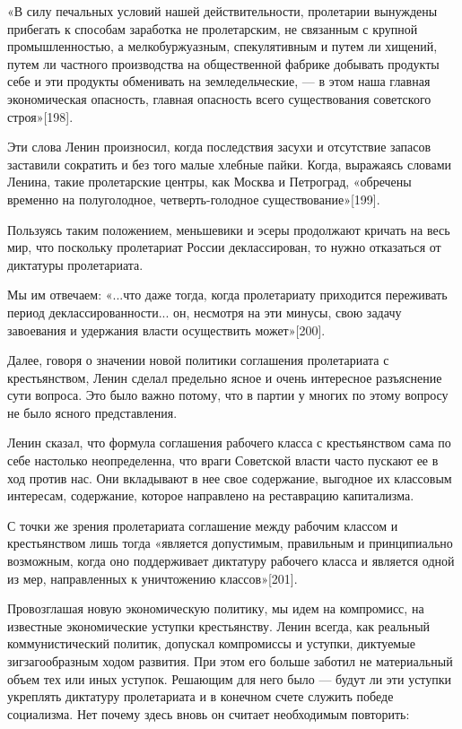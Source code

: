 \documentclass[12pt, a4paper, openany]{book}
\begin{document}
«В силу печальных условий нашей действительности, пролетарии вынуждены прибегать к способам заработка не пролетарским, не связанным с крупной промышленностью, а мелкобуржуазным, спекулятивным и путем ли хищений, путем ли частного производства на общественной фабрике добывать продукты себе и эти продукты обменивать на земледельческие, — в этом наша главная экономическая опасность, главная опасность всего существования советского строя»[198].

Эти слова Ленин произносил, когда последствия засухи и отсутствие запасов заставили сократить и без того малые хлебные пайки. Когда, выражаясь словами Ленина, такие пролетарские центры, как Москва и Петроград, «обречены временно на полуголодное, четверть-голодное существование»[199].

Пользуясь таким положением, меньшевики и эсеры продолжают кричать на весь мир, что поскольку пролетариат России деклассирован, то нужно отказаться от диктатуры пролетариата.

Мы им отвечаем: «...что даже тогда, когда пролетариату приходится переживать период деклассированности... он, несмотря на эти минусы, свою задачу завоевания и удержания власти осуществить может»[200].

Далее, говоря о значении новой политики соглашения пролетариата с крестьянством, Ленин сделал предельно ясное и очень интересное разъяснение сути вопроса. Это было важно потому, что в партии у многих по этому вопросу не было ясного представления.

Ленин сказал, что формула соглашения рабочего класса с крестьянством сама по себе настолько неопределенна, что враги Советской власти часто пускают ее в ход против нас. Они вкладывают в нее свое содержание, выгодное их классовым интересам, содержание, которое направлено на реставрацию капитализма.

С точки же зрения пролетариата соглашение между рабочим классом и крестьянством лишь тогда «является допустимым, правильным и принципиально возможным, когда оно поддерживает диктатуру рабочего класса и является одной из мер, направленных к уничтожению классов»[201].

Провозглашая новую экономическую политику, мы идем на компромисс, на известные экономические уступки крестьянству. Ленин всегда, как реальный коммунистический политик, допускал компромиссы и уступки, диктуемые зигзагообразным ходом развития. При этом его больше заботил не материальный объем тех или иных уступок. Решающим для него было — будут ли эти уступки укреплять диктатуру пролетариата и в конечном счете служить победе социализма. Нет почему здесь вновь он считает необходимым повторить:
\end{document}
